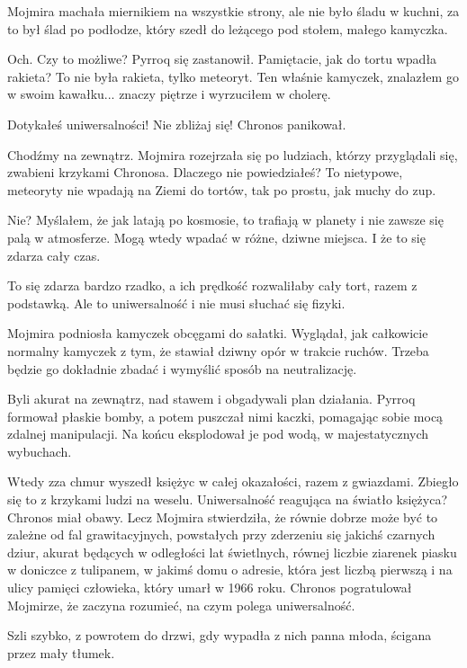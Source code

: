 Mojmira machała miernikiem na wszystkie strony, ale nie było śladu w kuchni, za to był ślad po podłodze, który szedł do leżącego pod stołem, małego kamyczka.

\ds{} Och. Czy to możliwe? \dm{} Pyrroq się zastanowił. \dm{} Pamiętacie, jak do tortu wpadła rakieta? To nie była rakieta, tylko meteoryt. 
Ten właśnie kamyczek, znalazłem go w swoim kawałku... znaczy piętrze i wyrzuciłem w cholerę. \de{}

\ds{} Dotykałeś uniwersalności! Nie zbliżaj się! \dm{} Chronos panikował. \de{}

\ds{} Chodźmy na zewnątrz. \dm{} Mojmira rozejrzała się po ludziach, którzy przyglądali się, zwabieni krzykami Chronosa. \dm{} 
Dlaczego nie powiedziałeś? To nietypowe, meteoryty nie wpadają na Ziemi do tortów, tak po prostu, jak muchy do zup. \de{}

\ds{} Nie? Myślałem, że jak latają po kosmosie, to trafiają w planety i nie zawsze się palą w atmosferze. Mogą wtedy wpadać w różne, dziwne miejsca. 
I że to się zdarza cały czas. \de{}

\ds{} To się zdarza bardzo rzadko, a ich prędkość rozwaliłaby cały tort, razem z podstawką. Ale to uniwersalność i nie musi słuchać się fizyki. 

Mojmira podniosła kamyczek obcęgami do sałatki. 
Wyglądał, jak całkowicie normalny kamyczek z tym, że stawiał dziwny opór w trakcie ruchów.
Trzeba będzie go dokładnie zbadać i wymyślić sposób na neutralizację.

\divider{}

Byli akurat na zewnątrz, nad stawem i obgadywali plan działania. 
Pyrroq formował płaskie bomby, a potem puszczał nimi kaczki, pomagając sobie mocą zdalnej manipulacji.
Na końcu eksplodował je pod wodą, w majestatycznych wybuchach.

Wtedy zza chmur wyszedł księżyc w całej okazałości, razem z gwiazdami.
Zbiegło się to z krzykami ludzi na weselu. 
Uniwersalność reagująca na światło księżyca? Chronos miał obawy.
Lecz Mojmira stwierdziła, że równie dobrze może być to zależne od fal grawitacyjnych, powstałych przy zderzeniu się jakichś czarnych dziur, akurat będących 
w odległości lat świetlnych, równej liczbie ziarenek piasku w doniczce z 
tulipanem, w jakimś domu o adresie, która jest liczbą pierwszą i na ulicy pamięci człowieka, który umarł w 1966 roku.
Chronos pogratulował Mojmirze, że zaczyna rozumieć, na czym polega uniwersalność.

Szli szybko, z powrotem do drzwi, gdy wypadła z nich panna młoda, ścigana przez mały tłumek.

